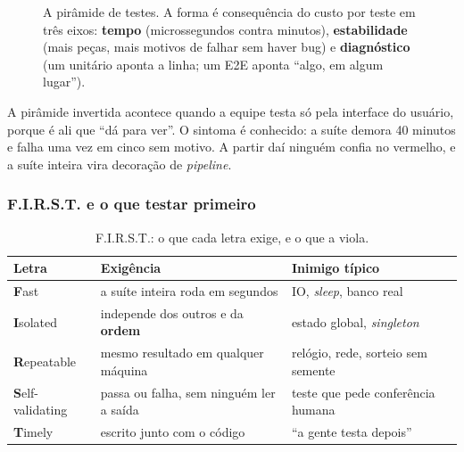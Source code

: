 \begin{figure}[htbp]
\centering
{}
\caption{A pirâmide de testes. A forma é consequência do custo por teste em três
         eixos: \textbf{tempo} (microssegundos contra minutos),
         \textbf{estabilidade} (mais peças, mais motivos de falhar sem haver bug)
         e \textbf{diagnóstico} (um unitário aponta a linha; um E2E aponta
         ``algo, em algum lugar'').}
\label{fig:piramide}
\end{figure}

\begin{armadilha}
A pirâmide invertida acontece quando a equipe testa só pela interface do usuário,
porque é ali que ``dá para ver''. O sintoma é conhecido: a suíte demora 40
minutos e falha uma vez em cinco sem motivo. A partir daí ninguém confia no
vermelho, e a suíte inteira vira decoração de \emph{pipeline}.
\end{armadilha}

\subsubsection{F.I.R.S.T. e o que testar primeiro}

\begin{table}[htbp]
\centering
\caption{F.I.R.S.T.: o que cada letra exige, e o que a viola.}
\label{tab:first}
\footnotesize
\begin{tabular}{@{}lll@{}}
\toprule
\textbf{Letra} & \textbf{Exigência} & \textbf{Inimigo típico} \\
\midrule
\textbf{F}ast            & a suíte inteira roda em segundos & IO, \emph{sleep}, banco real \\
\textbf{I}solated        & independe dos outros e da \textbf{ordem} & estado global, \emph{singleton} \\
\textbf{R}epeatable      & mesmo resultado em qualquer máquina & relógio, rede, sorteio sem semente \\
\textbf{S}elf-validating & passa ou falha, sem ninguém ler a saída & teste que pede conferência humana \\
\textbf{T}imely          & escrito junto com o código & ``a gente testa depois'' \\
\bottomrule
\end{tabular}
\end{table}

